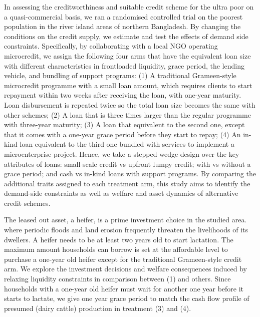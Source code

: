 	In assessing the creditworthiness and suitable credit scheme for the ultra poor on a quasi-commercial basis, we ran a randomised controlled trial on the poorest population in the river island areas of northern Bangladesh. By changing the conditions on the credit supply, we estimate and test the effects of demand side constraints. Specifically, by collaborating with a local NGO operating microcredit,  we assign the following four arms that have the equivalent loan size with different characteristics in frontloaded liquidity, grace period, the lending vehicle, and bundling of support programs: (1) A traditional Grameen-style microcredit programme with a small loan amount, which requires clients to start repayment within two weeks after receiving the loan, with one-year maturity. Loan disbursement is repeated twice so the total loan size becomes the same with other schemes; (2) A loan that is three times larger than the regular programme with three-year maturity; (3) A loan that equivalent to the second one, except that it comes with a one-year grace period before they start to repay; (4) An in-kind loan equivalent to the third one bundled with services to implement a microenterprise project. Hence, we take a stepped-wedge design over the key attributes of loans: small-scale credit vs upfront lumpy credit; with vs without a grace period; and cash vs in-kind loans with support programs. By comparing the additional traits assigned to each treatment arm, this study aims to identify the demand-side constraints as well as welfare and asset dynamics of alternative credit schemes. 
	
	The leased out asset, a heifer, is a prime investment choice in the studied area. where periodic floods and land erosion frequently threaten the livelihoods of its dwellers. A heifer needs to be at least two years old to start lactation. The maximum amount households can borrow is set at the affordable level to purchase a one-year old heifer except for the traditional Grameen-style credit arm. We explore the investment decisions and welfare consequences induced by relaxing liquidity constraints in comparison between (1) and others.  Since  households with a one-year old heifer must wait for another one year before it starts to lactate, we give one year grace period to match the cash flow profile of presumed (dairy cattle) production in treatment (3) and (4).  

